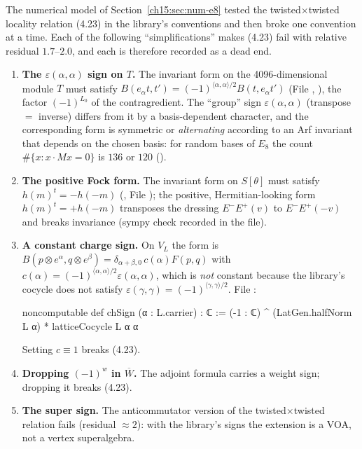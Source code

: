 The numerical model of Section~\ref{ch15:sec:num-e8} tested the twisted$\times$twisted locality
relation (4.23) in the library's conventions and then broke one convention at a time. Each of the
following ``simplifications'' makes (4.23) fail with relative residual $1.7$--$2.0$, and each is
therefore recorded as a dead end.
\begin{enumerate}
\item \textbf{The $\varepsilon(\alpha,\alpha)$ sign on $T$.} The invariant form on the 4096-dimensional
  module $T$ must satisfy $B(e_\alpha t,t')=(-1)^{\langle\alpha,\alpha\rangle/2}B(t,e_\alpha t')$
  (File , ), the factor $(-1)^{L_0}$ of the
  contragredient. The ``group'' sign $\varepsilon(\alpha,\alpha)$ (transpose $=$ inverse) differs from
  it by a basis-dependent character, and the corresponding form is symmetric or \emph{alternating}
  according to an Arf invariant that depends on the chosen basis: for random bases of $E_8$ the
  count $\#\{x:x\cdot Mx=0\}$ is $136$ or $120$
  ().
\item \textbf{The positive Fock form.} The invariant form on $S[\theta]$ must satisfy
  $h(m)^{t}=-h(-m)$ (, File ); the positive,
  Hermitian-looking form $h(m)^t=+h(-m)$ transposes the dressing $E^-E^+(v)$ to $E^-E^+(-v)$ and
  breaks invariance (sympy check recorded in the file).
\item \textbf{A constant charge sign.} On $V_L$ the form is
  $B(p\otimes e^\alpha,q\otimes e^\beta)=\delta_{\alpha+\beta,0}\,c(\alpha)F(p,q)$ with
  $c(\alpha)=(-1)^{\langle\alpha,\alpha\rangle/2}\varepsilon(\alpha,\alpha)$, which is \emph{not} constant
  because the library's cocycle does not satisfy $\varepsilon(\gamma,\gamma)=(-1)^{\langle\gamma,\gamma\rangle/2}$.
  File :
\begin{leancode}
noncomputable def chSign (α : L.carrier) : ℂ :=
  (-1 : ℂ) ^ (LatGen.halfNorm L α) * latticeCocycle L α α
\end{leancode}
  Setting $c\equiv1$ breaks (4.23).
\item \textbf{Dropping $(-1)^w$ in $\overline W$.} The adjoint formula carries a weight sign; dropping it
  breaks (4.23).
\item \textbf{The super sign.} The anticommutator version of the twisted$\times$twisted relation
  fails (residual $\approx2$): with the library's signs the extension is a VOA, not a vertex
  superalgebra.
\end{enumerate}

